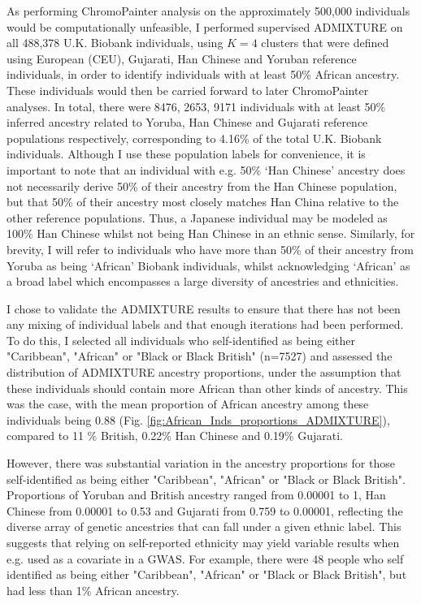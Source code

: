 {As performing ChromoPainter analysis on the approximately 500,000 individuals would be computationally unfeasible, I performed supervised ADMIXTURE on all 488,378 U.K. Biobank individuals, using $K=4$ clusters that were defined using European (CEU), Gujarati, Han Chinese and Yoruban reference individuals, in order to identify individuals with at least 50\% African ancestry. These individuals would then be carried forward to later ChromoPainter analyses. In total, there were 8476, 2653, 9171 individuals with at least 50\% inferred ancestry related to Yoruba, Han Chinese and Gujarati reference populations respectively, corresponding to 4.16\% of the total U.K. Biobank individuals. Although I use these population labels for convenience, it is important to note that an individual with e.g. 50\% `Han Chinese' ancestry does not necessarily derive 50\% of their ancestry from the Han Chinese population, but that 50\% of their ancestry most closely matches Han China relative to the other reference populations. Thus, a Japanese individual may be modeled as 100\% Han Chinese whilst not being Han Chinese in an ethnic sense. Similarly, for brevity, I will refer to individuals who have more than 50\% of their ancestry from Yoruba as being `African' Biobank individuals, whilst acknowledging `African' as a broad label which encompasses a large diversity of ancestries and ethnicities.  

I chose to validate the ADMIXTURE results to ensure that there has not been any mixing of individual labels and that enough iterations had been performed. To do this, I selected all individuals who self-identified as being either "Caribbean", "African" or "Black or Black British" (n=7527) and assessed the distribution of ADMIXTURE ancestry proportions, under the assumption that these individuals should contain more African than other kinds of ancestry. This was the case, with the mean proportion of African ancestry among these individuals being 0.88 (Fig. \ref{fig:African_Inds_proportions_ADMIXTURE}), compared to 11 \% British, 0.22\% Han Chinese and 0.19\% Gujarati.

However, there was substantial variation in the ancestry proportions for those self-identified as being either "Caribbean", "African" or "Black or Black British". Proportions of Yoruban and British ancestry ranged from 0.00001 to 1, Han Chinese from 0.00001 to 0.53 and Gujarati from 0.759 to 0.00001, reflecting the diverse array of genetic ancestries that can fall under a given ethnic label. This suggests that relying on self-reported ethnicity may yield variable results when e.g. used as a covariate in a GWAS. For example, there were 48 people who self identified as being either "Caribbean", "African" or "Black or Black British", but had less than 1\% African ancestry.

}
